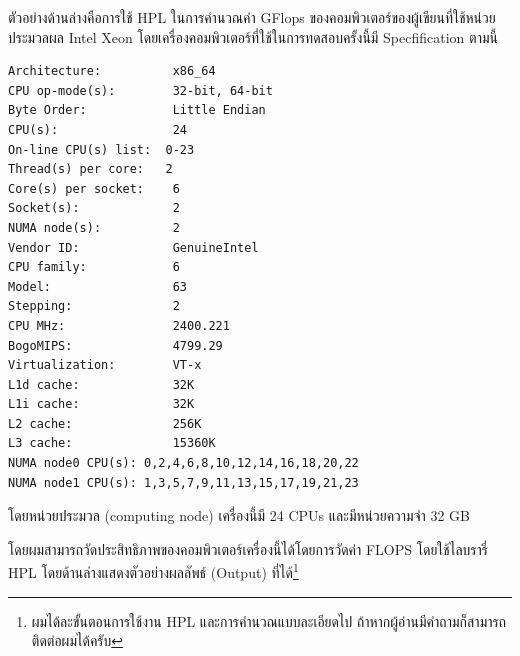 ตัวอย่างด้านล่างคือการใช้ HPL ในการคำนวณค่า GFlops ของคอมพิวเตอร์ของผู้เขียนที่ใช้หน่วยประมวลผล Intel Xeon โดยเครื่องคอมพิวเตอร์ที่ใช้ในการทดสอบครั้งนี้มี Specfification ตามนี้

\vspace{5pt}

\begin{lstlisting}[basicstyle=\ttfamily\footnotesize\linespread{0.5}]
Architecture:          x86_64
CPU op-mode(s):        32-bit, 64-bit
Byte Order:            Little Endian
CPU(s):                24
On-line CPU(s) list:  0-23
Thread(s) per core:   2
Core(s) per socket:    6
Socket(s):             2
NUMA node(s):          2
Vendor ID:             GenuineIntel
CPU family:            6
Model:                 63
Stepping:              2
CPU MHz:               2400.221
BogoMIPS:              4799.29
Virtualization:        VT-x
L1d cache:             32K
L1i cache:             32K
L2 cache:              256K
L3 cache:              15360K
NUMA node0 CPU(s): 0,2,4,6,8,10,12,14,16,18,20,22
NUMA node1 CPU(s): 1,3,5,7,9,11,13,15,17,19,21,23
\end{lstlisting}

\vspace{5pt}

\noindent โดยหน่วยประมวล (computing node) เครื่องนี้มี 24 CPUs และมีหน่วยความจำ 32 GB

โดยผมสามารถวัดประสิทธิภาพของคอมพิวเตอร์เครื่องนี้ได้โดยการวัดค่า FLOPS โดยใช้ไลบรารี่ HPL โดยด้านล่างแสดงตัวอย่างผลลัพธ์ (Output) ที่ได้\footnote{ผมได้ละขั้นตอนการใช้งาน HPL และการคำนวณแบบละเอียดไป ถ้าหากผู้อ่านมีคำถามก็สามารถติดต่อผมได้ครับ}

\vspace{5pt}

